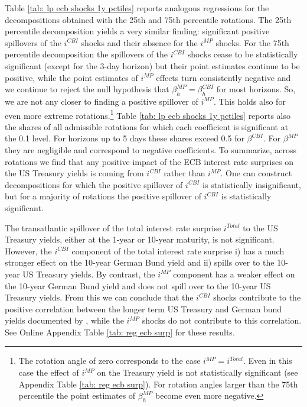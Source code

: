 \documentclass[a4paper,12pt]{article}
\begin{document}
Table \ref{tab: lp ecb shocks 1y pctiles} reports analogous regressions for the decompositions obtained with the 25th and 75th percentile rotations. The 25th percentile decomposition yields a very similar finding: significant positive spillovers of the $i^{CBI}$ shocks
and their absence for the $i^{MP}$ shocks. For the 75th percentile decomposition the spillovers
of the $i^{CBI}$ shocks cease to be statistically significant (except for the 3-day horizon)
but their point estimates continue to be positive, while the point estimates of $i^{MP}$
effects turn consistently negative and we continue to reject the null hypothesis that $\beta^{MP}_h=\beta^{CBI}_h$ for most horizons. So, we are not any closer to finding a positive spillover of $i^{MP}$. This holds also for even more extreme rotations.\footnote{The rotation angle of zero corresponds to the case $i^{MP}=i^{Total}$. Even in this case the effect of $i^{MP}$ on the Treasury yield is not statistically significant (see Appendix Table \ref{tab: reg ecb surp}).
For rotation angles larger than the 75th percentile the point estimates of $\beta_h^{MP}$ become even more negative.} 
Table \ref{tab: lp ecb shocks 1y pctiles} reports also the shares of all admissible rotations for which each coefficient is significant at the 0.1 level. For horizons up to 5 days these shares exceed 0.5 for $\beta^{CBI}$. For $\beta^{MP}$ they are negligible and correspond to negative coefficients.
To summarize, across rotations we find that any positive impact of the ECB interest rate surprises on the US Treasury yields is coming from $i^{CBI}$ rather than $i^{MP}$. One can construct decompositions for which the positive spillover of $i^{CBI}$ is statistically insignificant, but for a majority of rotations the positive spillover of $i^{CBI}$ is statistically significant.


The transatlantic spillover of the total interest rate surprise $i^{Total}$ to the US Treasury yields, either at the 1-year or 10-year maturity, is not significant. However, the $i^{CBI}$ component of the total interest rate surprise
i) has a much stronger effect on the 10-year German Bund yield and ii) spills over to the 10-year US Treasury yields. By contrast, the $i^{MP}$ component has a weaker effect on the 10-year German Bund yield and does not spill over to the 10-year US Treasury yields.
From this we can conclude that the $i^{CBI}$ shocks contribute to the positive correlation between the longer term US Treasury and German bund yields documented by \cite{Curcuru_etal_2018}, while the $i^{MP}$ shocks do not contribute to this correlation.
See Online Appendix Table \ref{tab: reg ecb surp} for these results.
\end{document}
